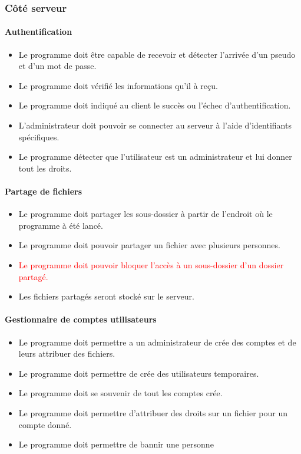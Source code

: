 \documentclass[10pt,a4paper]{report}
\begin{document}
\subsubsection{Côté serveur}
\paragraph{Authentification}
	\begin{itemize}[label = $\triangleright$]
		\item Le programme doit être capable de recevoir et détecter l'arrivée d'un pseudo et d'un mot de passe.
		\item Le programme doit vérifié les informations qu'il à reçu.
		\item Le programme doit indiqué au client le succès ou l'échec d'authentification.
		\item L'administrateur doit pouvoir se connecter au serveur à l'aide d'identifiants spécifiques.
		\item Le programme détecter que l'utilisateur est un administrateur et lui donner tout les droits.	
	\end{itemize}
	
\paragraph{Partage de fichiers}
	\begin{itemize}[label = $\triangleright$]
		\item Le programme doit partager les sous-dossier à partir de l'endroit où le programme à été lancé.
		\item Le programme doit pouvoir partager un fichier avec plusieurs personnes.
		\item \textcolor{red}{Le programme doit pouvoir bloquer l'accès à un sous-dossier d'un dossier partagé. }
		\item Les fichiers partagés seront stocké sur le serveur.
	\end{itemize}
	
\paragraph{Gestionnaire de comptes utilisateurs}
	\begin{itemize}[label = $\triangleright$]
		\item Le programme doit permettre a un administrateur de crée des comptes et de leurs attribuer des fichiers.
		\item Le programme doit permettre de crée des utilisateurs temporaires.
		\item Le programme doit se souvenir de tout les comptes crée.
		\item Le programme doit permettre d'attribuer des droits sur un fichier pour un compte donné.
		\item Le programme doit permettre de bannir une personne
	\end{itemize}
\end{document}
